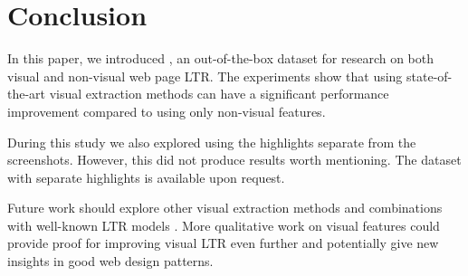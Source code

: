 
\section{Conclusion}
In this paper, we introduced  \datasetname, an out-of-the-box dataset for research on both visual and non-visual web page \ac{LTR}.
The experiments show that using state-of-the-art visual extraction methods can have a significant performance improvement compared to using only non-visual features. 

 During this study we also explored using the highlights separate from the screenshots. However, this did not produce results worth mentioning. The dataset with separate highlights is available upon request. 
\fi

Future work should explore other visual extraction methods  and combinations with well-known \ac{LTR} models .
More qualitative work on visual features could provide proof for improving visual \ac{LTR} even further and potentially give new insights in good web design patterns. 

